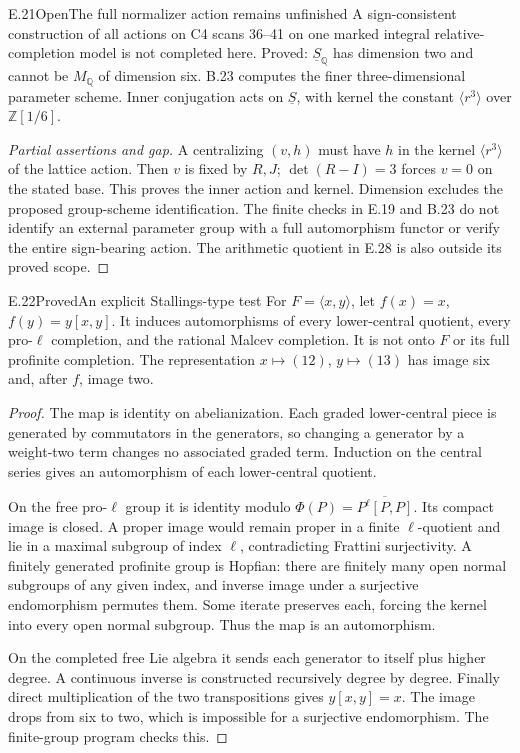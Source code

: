 \begin{statement}{E.21}{Open}{The full normalizer action remains unfinished}
A sign-consistent construction of all actions on C4
scans 36--41 on one marked integral relative-completion
model is not completed here.
Proved: $\underline S_{\mathbb Q}$ has dimension two
and cannot be $M_{\mathbb Q}$ of dimension six.
B.23 computes the finer three-dimensional parameter
scheme. Inner conjugation acts on $\underline S$,
with kernel the constant $\langle r^3\rangle$
over $\mathbb Z[1/6]$.
\end{statement}
\begin{proof}[Partial assertions and gap]
A centralizing $(v,h)$ must have $h$ in the kernel
$\langle r^3\rangle$ of the lattice action.
Then $v$ is fixed by $R,J$; $\det(R-I)=3$ forces
$v=0$ on the stated base.
This proves the inner action and kernel.
Dimension excludes the proposed group-scheme identification.
The finite checks in E.19 and B.23 do not identify an
external parameter group with a full automorphism
functor or verify the entire sign-bearing action.
The arithmetic quotient in E.28 is also outside its
proved scope.
\end{proof}

\begin{statement}{E.22}{Proved}{An explicit Stallings-type test}
For $F=\langle x,y\rangle$, let
$f(x)=x$, $f(y)=y[x,y]$.
It induces automorphisms of every lower-central quotient,
every pro-$\ell$ completion, and the rational Malcev
completion. It is not onto $F$ or its full profinite
completion. The representation $x\mapsto(12)$,
$y\mapsto(13)$ has image six and, after $f$, image two.
\end{statement}
\begin{proof}
The map is identity on abelianization.
Each graded lower-central piece is generated by
commutators in the generators, so changing a generator
by a weight-two term changes no associated graded term.
Induction on the central series gives an automorphism
of each lower-central quotient.

On the free pro-$\ell$ group it is identity modulo
$\Phi(P)=\overline{P^\ell[P,P]}$.
Its compact image is closed. A proper image would
remain proper in a finite $\ell$-quotient and lie
in a maximal subgroup of index $\ell$, contradicting
Frattini surjectivity.
A finitely generated profinite group is Hopfian:
there are finitely many open normal subgroups of any
given index, and inverse image under a surjective
endomorphism permutes them. Some iterate preserves each,
forcing the kernel into every open normal subgroup.
Thus the map is an automorphism.

On the completed free Lie algebra it sends each generator
to itself plus higher degree. A continuous inverse is
constructed recursively degree by degree.
Finally direct multiplication of the two transpositions
gives $y[x,y]=x$. The image drops from six to two,
which is impossible for a surjective endomorphism.
The finite-group program checks this.
\end{proof}

